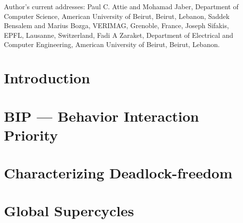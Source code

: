 \documentclass[prodmode,acmtosem]{acmsmall} %
\begin{document}



\begin{bottomstuff}
Author's current addresses: Paul C. Attie {and} Mohamad Jaber,
Department of Computer Science, American University of Beirut, Beirut, Lebanon,
Saddek Bensalem and Marius Bozga, VERIMAG, Grenoble, France,
Joseph Sifakis, EPFL, Lausanne, Switzerland, 
Fadi A Zaraket, Department of Electrical and Computer Engineering,
 American University of Beirut, Beirut, Lebanon.
\end{bottomstuff}



\maketitle



\section{Introduction}
\label{s:intro}



\section{BIP --- Behavior Interaction Priority}
\label{s:bip}



\section{Characterizing Deadlock-freedom}
\label{s:characterize}



\section{Global Supercycles}
\label{secn:globalSupercycles}

\end{document}
